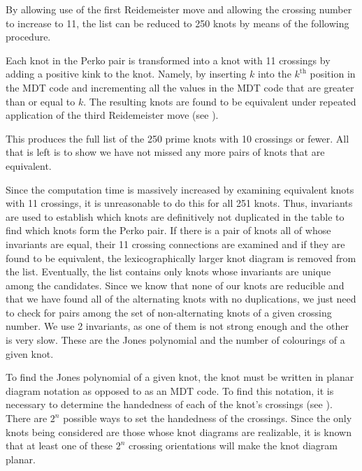 \begin{paper}
By allowing use of the first Reidemeister move and allowing the crossing number
to increase to 11, the list can be reduced to 250 knots by means of the
following procedure.


Each knot in the Perko pair is transformed into a knot with 11 crossings by
adding a positive kink to the knot.
Namely, by inserting $k$ into the $k^\text{th}$ position in the MDT code and
incrementing all the values in the MDT code that are greater than or equal to
$k$.
The resulting knots are found to be equivalent under repeated application of the
third Reidemeister move (see \figMoves).


This produces the full list of the 250 prime knots with 10 crossings or fewer.
All that is left is to show we have not missed any more pairs of knots that are
equivalent.


Since the computation time is massively increased by examining equivalent knots
with 11 crossings, it is unreasonable to do this for all 251 knots.
Thus, invariants are used to establish which knots are definitively not
duplicated in the table to find which knots form the Perko pair.
If there is a pair of knots all of whose invariants are equal, their 11 crossing
connections are examined and if they are found to be equivalent, the
lexicographically larger knot diagram is removed from the list.
Eventually, the list contains only knots whose invariants are unique among the
candidates.
Since we know that none of our knots are reducible and that we have found all of
the alternating knots with no duplications, we just need to check for pairs
among the set of non-alternating knots of a given crossing number.
We use 2 invariants, as one of them is not strong enough and the other is very
slow.
These are the Jones polynomial and the number of colourings of a given knot.



To find the Jones polynomial of a given knot, the knot must be written in planar
diagram notation as opposed to as an MDT code.
To find this notation, it is necessary to determine the handedness of each of
the knot's crossings (see \figCrossings).
There are $2^n$ possible ways to set the handedness of the crossings.
Since the only knots being considered are those whose knot diagrams are
realizable, it is known that at least one of these $2^n$ crossing orientations
will make the knot diagram planar.


\end{paper}
